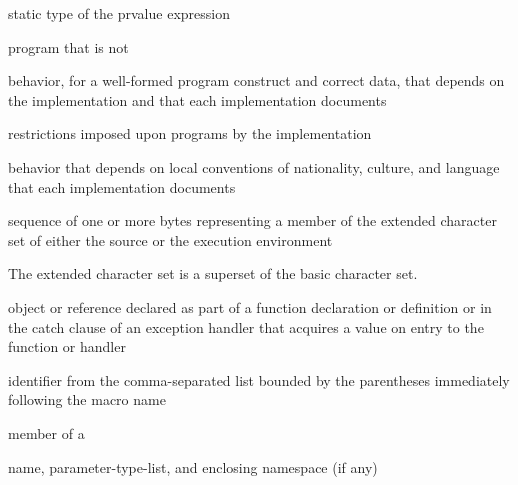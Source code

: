 %
 static type of the prvalue expression

%
program that is not 

%
behavior, for a well-formed program construct and correct data, that
depends on the implementation and that each implementation documents

%
restrictions imposed upon programs by the implementation

%
behavior that depends on local conventions of nationality, culture, and
language that each implementation documents

%
sequence of one or more bytes representing a member of the extended
character set of either the source or the execution environment

\begin{defnote}
The extended character set is a superset of the basic character
set.
\end{defnote}

%
%
%
 object or reference declared as part of a function declaration or
definition or in the catch clause of an exception handler that
acquires a value on entry to the function or handler

%
%
 identifier from
the comma-separated list bounded by the parentheses immediately
following the macro name

%
%
 member of a 

%
name,
parameter-type-list,
and enclosing namespace (if any)

